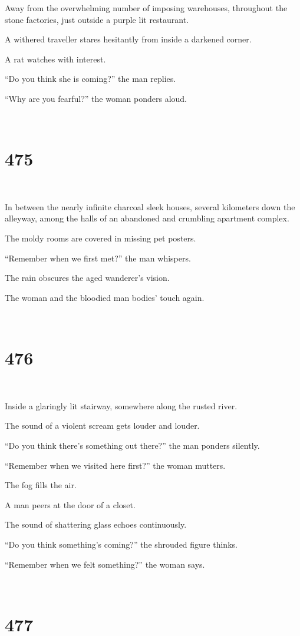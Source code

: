 \documentclass{report}
\begin{document}
Away from the overwhelming number of imposing warehouses, throughout the stone factories, just outside a purple lit restaurant.

A withered traveller stares hesitantly from inside a darkened corner.

A rat watches with interest.

``Do you think she is coming?'' the man replies.

``Why are you fearful?'' the woman ponders aloud.

~
\chapter*{475}
~

In between the nearly infinite charcoal sleek houses, several kilometers down the alleyway, among the halls of an abandoned and crumbling apartment complex.

The moldy rooms are covered in missing pet posters.

``Remember when we first met?'' the man whispers.

The rain obscures the aged wanderer's vision.

The woman and the bloodied man bodies' touch again.

~
\chapter*{476}
~

Inside a glaringly lit stairway, somewhere along the rusted river.

The sound of a violent scream gets louder and louder.

``Do you think there's something out there?'' the man ponders silently.

``Remember when we visited here first?'' the woman mutters.

The fog fills the air.

A man peers at the door of a closet.

The sound of shattering glass echoes continuously.

``Do you think something's coming?'' the shrouded figure thinks.

``Remember when we felt something?'' the woman says.

~
\chapter*{477}
~
\end{document}
